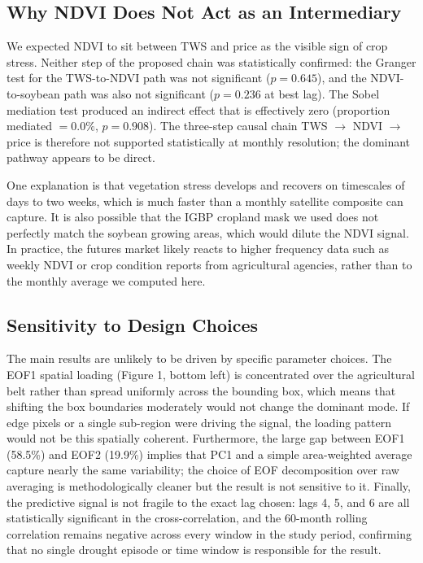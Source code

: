 \documentclass[6pt, twocolumn]{article}
\begin{document}
\subsection{Why NDVI Does Not Act as an Intermediary}

We expected NDVI to sit between TWS and price as the visible sign
of crop stress. Neither step of the proposed chain was statistically
confirmed: the Granger test for the TWS-to-NDVI path was not
significant ($p = 0.645$), and the NDVI-to-soybean path was also
not significant ($p = 0.236$ at best lag). The Sobel mediation
test produced an indirect effect that is effectively zero
(proportion mediated $= 0.0\%$, $p = 0.908$). The three-step
causal chain TWS $\to$ NDVI $\to$ price is therefore not supported
statistically at monthly resolution; the dominant pathway appears
to be direct.

One explanation is that vegetation stress develops and recovers on
timescales of days to two weeks, which is much faster than a monthly
satellite composite can capture. It is also possible that the IGBP
cropland mask we used does not perfectly match the soybean growing
areas, which would dilute the NDVI signal. In practice, the futures
market likely reacts to higher frequency data such as weekly NDVI or
crop condition reports from agricultural agencies, rather than to
the monthly average we computed here.

\subsection{Sensitivity to Design Choices}

The main results are unlikely to be driven by specific parameter choices. The EOF1 spatial loading (Figure 1, bottom left) is concentrated over the agricultural belt rather than spread uniformly across the bounding box, which means that shifting the box boundaries moderately would not change the dominant mode. If edge pixels or a single sub-region were driving the signal, the loading pattern would not be this spatially coherent. Furthermore, the large gap between EOF1 (58.5\%) and EOF2 (19.9\%) implies that PC1 and a simple area-weighted average capture nearly the same variability; the choice of EOF decomposition over raw averaging is methodologically cleaner but the result is not sensitive to it. Finally, the predictive signal is not fragile to the exact lag chosen: lags 4, 5, and 6 are all statistically significant in the cross-correlation, and the 60-month rolling correlation remains negative across every window in the study period, confirming that no single drought episode or time window is responsible for the result.
\end{document}

